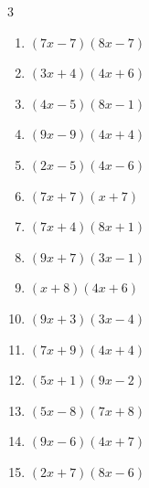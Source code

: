 \begin{multicols}{3}
\begin{enumerate}
  \item $(7x-7)(8x-7)$


  \item $(3x+4)(4x+6)$


  \item $(4x-5)(8x-1)$


  \item $(9x-9)(4x+4)$


  \item $(2x-5)(4x-6)$


  \item $(7x+7)(x+7)$


  \item $(7x+4)(8x+1)$


  \item $(9x+7)(3x-1)$


  \item $(x+8)(4x+6)$


  \item $(9x+3)(3x-4)$


\columnbreak %

  \item $(7x+9)(4x+4)$


  \item $(5x+1)(9x-2)$


  \item $(5x-8)(7x+8)$


  \item $(9x-6)(4x+7)$


  \item $(2x+7)(8x-6)$


\end{enumerate}
\end{multicols}
